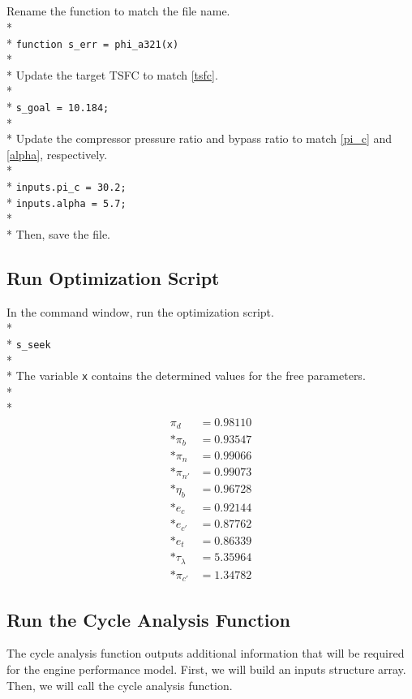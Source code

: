 \documentclass[12pt,twoside]{article}
\begin{document}
\subparagraph{}
Rename the function to match the file name. \\*
\\*
\texttt{function s\_err = phi\_a321(x)} \\*
\\*
Update the target TSFC to match \eqref{tsfc}. \\*
\\*
\texttt{s\_goal = 10.184;} \\*
\\*
Update the compressor pressure ratio and bypass ratio to match \eqref{pi_c} and \eqref{alpha}, respectively. \\*
\\*
\texttt{inputs.pi\_c = 30.2;} \\*
\texttt{inputs.alpha = 5.7;} \\*
\\*
Then, save the file.

\subsection{Run Optimization Script}\label{sec:run-opt-scr}
In the command window, run the optimization script. \\*
\\*
\texttt{s\_seek} \\*
\\*
The variable \texttt{x} contains the determined values for the free parameters.\\*
\\*
\begin{align}
  \pi_d & = 0.98110 \nonumber \\*
  \pi_b & = 0.93547 \nonumber \\*
  \pi_n & = 0.99066 \nonumber \\*
  \pi_{n'} & = 0.99073 \nonumber \\*
  \eta_b & = 0.96728 \\*
  e_c & = 0.92144 \nonumber \\*
  e_{c'} & = 0.87762 \nonumber \\*
  e_t & = 0.86339 \nonumber \\*
  \tau_\lambda & = 5.35964 \nonumber \\*
  \pi_{c'} & = 1.34782 \nonumber
\end{align}

\subsection{Run the Cycle Analysis Function}\label{sec:run-cyc-ana}
The cycle analysis function outputs additional information that will be required for the engine performance model.  First, we will build an inputs structure array.  Then, we will call the cycle analysis function.
\end{document}
